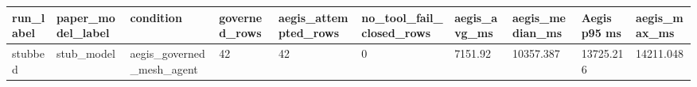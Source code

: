 \begin{tabular}{llllllllll}
 \hline
run\_label & paper\_model\_label & condition & governed\_rows & aegis\_attempted\_rows & no\_tool\_fail\_closed\_rows & aegis\_avg\_ms & aegis\_median\_ms & Aegis p95 ms & aegis\_max\_ms \\
 \hline
stubbed & stub\_model & aegis\_governed\_mesh\_agent & 42 & 42 & 0 & 7151.92 & 10357.387 & 13725.216 & 14211.048 \\
 \hline
\end{tabular}
